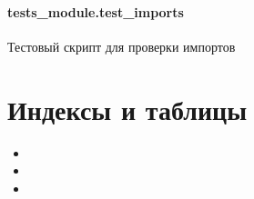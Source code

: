 \documentclass[a4paper,11pt,russian,openany,oneside]{sphinxmanual}
\begin{document}
\sphinxstepscope


\subsubsection{tests\_module.test\_imports}
\label{\detokenize{_autosummary/tests_module.test_imports:module-tests_module.test_imports}}\label{\detokenize{_autosummary/tests_module.test_imports:tests-module-test-imports}}\label{\detokenize{_autosummary/tests_module.test_imports::doc}}
\sphinxAtStartPar
Тестовый скрипт для проверки импортов


\chapter{Индексы и таблицы}
\label{\detokenize{index:id4}}\begin{itemize}
\item {} 
\sphinxAtStartPar
{}

\item {} 
\sphinxAtStartPar
{}

\item {} 
\sphinxAtStartPar
{}

\end{itemize}
\end{document}
